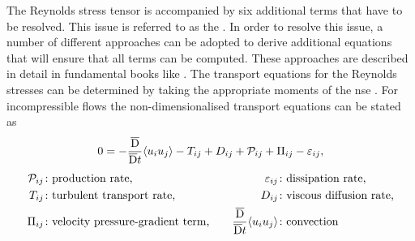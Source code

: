 The Reynolds stress tensor is accompanied by six additional terms that have to be resolved.
This issue is referred to as the  \citep{wilcox_turbulence_2006}.
%
In order to resolve this issue, a number of different approaches can be adopted  to derive additional equations that will ensure that all terms can be computed. These approaches are described in detail in fundamental books like \citet{wilcox_turbulence_2006,pope_turbulent_2015,moin_fundamentals_2024}.
The transport equations for the Reynolds stresses can be determined by taking the appropriate moments of the \acrshort{nse} \citep{mansour_reynolds-stress_1988}.
For incompressible flows the non-dimensionalised transport equations can be stated as 
\begin{gather}
    0 = -\frac{\overline{\mathrm{D}}}{\overline{\mathrm{D}}t} \langle u_i u_j \rangle - T_{ij} + D_{ij} + \mathcal{P}_{ij} + \Pi_{ij} - \varepsilon_{ij}, \\[4pt]
    \begin{aligned}
        \mathcal{P}_{ij} &\colon \text{production rate,} & \quad \varepsilon_{ij} &\colon \text{dissipation rate,} \\
        T_{ij} &\colon \text{turbulent transport rate,} & \quad D_{ij} &\colon \text{viscous diffusion rate,} \\
        \Pi_{ij} &\colon \text{velocity pressure-gradient term,} & \quad \frac{\overline{\mathrm{D}}}{\overline{\mathrm{D}}t} \langle u_i u_j \rangle &\colon \text{convection}
    \end{aligned} \notag
\end{gather}



